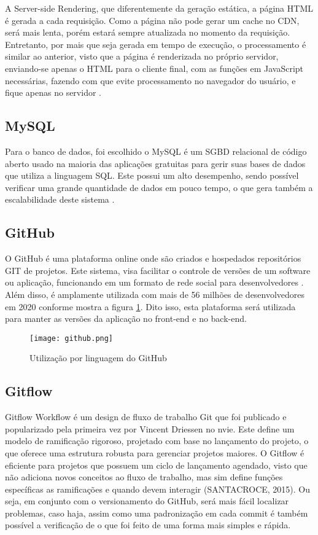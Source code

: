 A Server-side Rendering, que diferentemente da geração estática, a página HTML é gerada a cada requisição. Como a página não pode gerar um cache no CDN, será mais lenta, porém estará sempre atualizada no momento da requisição. Entretanto, por mais que seja gerada em tempo de execução, o processamento é similar ao anterior, visto que a página é renderizada no próprio servidor, enviando-se apenas o HTML para o cliente final, com as funções em JavaScript necessárias, fazendo com que evite processamento no navegador do usuário, e fique apenas no servidor \cite{VERCEL}.

\subsection{MySQL}
Para o banco de dados, foi escolhido o MySQL é um SGBD relacional de código aberto usado na maioria das aplicações gratuitas para gerir suas bases de dados que utiliza a linguagem SQL. Este possui um alto desempenho, sendo possível verificar uma grande quantidade de dados em pouco tempo, o que gera também a escalabilidade deste sistema \cite{HEUSER}.

\subsection{GitHub}
O GitHub é uma plataforma online onde são criados e hospedados repositórios GIT de projetos. Este sistema, visa facilitar o controle de versões de um software ou aplicação, funcionando em um formato de rede social para desenvolvedores \cite{SANTACROCE}. Além disso, é amplamente utilizada com mais de 56 milhões de desenvolvedores em 2020 conforme mostra a figura \ref{utilizacao_github}. Dito isso, esta plataforma será utilizada para manter as versões da aplicação no front-end e no back-end.

\begin{figure}[H]
    \caption{\label{utilizacao_github}Utilização por linguagem do GitHub}
    \vspace{5pt}
    \centering
    \texttt{[image: github.png]}
    \vspace{5pt}
\end{figure}

\subsection{Gitflow}
Gitflow Workflow é um design de fluxo de trabalho Git que foi publicado e popularizado pela primeira vez por Vincent Driessen no nvie. Este define um modelo de ramificação rigoroso, projetado com base no lançamento do projeto, o que oferece uma estrutura robusta para gerenciar projetos maiores. O Gitflow é eficiente para projetos que possuem um ciclo de lançamento agendado, visto que não adiciona novos conceitos ao fluxo de trabalho, mas sim define funções específicas as ramificações e quando devem interagir (SANTACROCE, 2015). Ou seja, em conjunto com o versionamento do GitHub, será mais fácil localizar problemas, caso haja, assim como uma padronização em cada commit é também possível a verificação de o que foi feito de uma forma mais simples e rápida.

